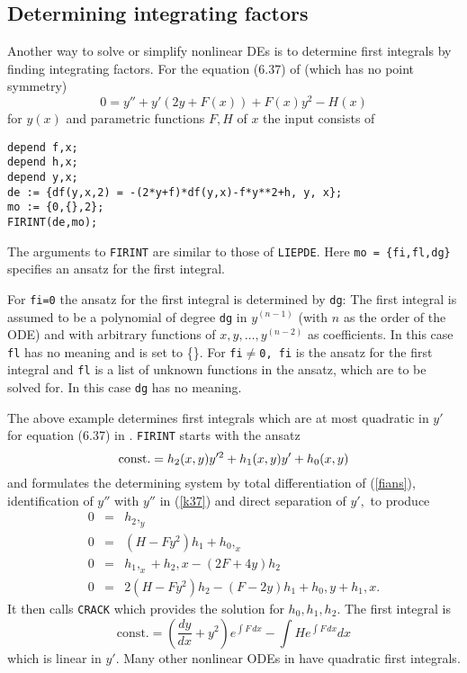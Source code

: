 \subsection{Determining integrating factors}
Another way to solve or simplify nonlinear DEs is to determine first
integrals by finding integrating factors. For the equation (6.37) of
\cite{Ka} (which has no point symmetry) 
\begin{equation}
0 = y'' + y'(2y + F(x)) + F(x)y^2 - H(x)  \label{k37} 
\end{equation}
for $y(x)$ and parametric functions $F, H$ of $x$ the input
consists of
\begin{verbatim}         
depend f,x;
depend h,x;
depend y,x;
de := {df(y,x,2) = -(2*y+f)*df(y,x)-f*y**2+h, y, x};
mo := {0,{},2};
FIRINT(de,mo);
\end{verbatim}
The arguments to {\tt FIRINT} are similar to those of {\tt LIEPDE}\@.
Here {\tt mo = \{fi,fl,dg\}} specifies an ansatz for the first integral.

   For {\tt fi=0} the ansatz for the first integral is determined by 
{\tt dg}: The first integral is assumed to be a 
polynomial of degree {\tt dg} in $y^{(n-1)}$ (with $n$ as the order of the ODE)
and with arbitrary functions of $x, y,\ldots,y^{(n-2)}$ as coefficients. 
In this case
{\tt fl} has no meaning and is set to \{\}.
For {\tt fi}$\neq${\tt 0, fi} is the ansatz for the first integral and
{\tt fl} is a list of
unknown functions in the ansatz, which are to be solved for. In this case
{\tt dg} has no meaning.

   The above example determines first integrals which are at most quadratic 
in $y'$ for equation (6.37) in \cite{Ka}.
{\tt FIRINT} starts with the ansatz 
\begin{equation}
{\rm const.} = h_2(x,y)y'^2 + h_1(x,y)y' + h_0(x,y)  \label{fians}
\end{equation}
and formulates the determining system by total differentiation of
(\ref{fians}), identification of $y''$ with $y''$ in (\ref{k37}) and
direct separation of $y',$ to produce
\begin{eqnarray*}
0 & = & h_2,_y  \\
0 & = & (H - F y^2)h_1 + h_0,_x  \\
0 & = & h_1,_x + h_2,x - (2F + 4y)h_2  \\
0 & = & 2(H - Fy^2)h_2 - (F - 2y)h_1 + h_0,y + h_1,x.
\end{eqnarray*} 
It then calls {\tt CRACK} which provides the solution for $h_0,h_1,h_2.$
The first integral is
\begin{equation}
\mbox{const.} = \left( \frac{dy}{dx}+y^2 \right) e^{\int \!F\,dx} - 
\int He^{\int \!F\,dx} dx
\end{equation}
which is linear in $y'$. Many other nonlinear ODEs in \cite{Ka} have quadratic
first integrals.

